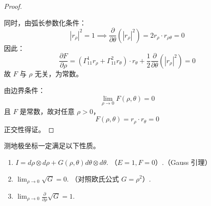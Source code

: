 \documentclass[lang=cn,10pt,thmcnt=section]{elegantbook}
\begin{document}
\begin{proof}
\begin{enumerate}
    同时，由弧长参数化条件：
    \[
    |r_\rho|^2 = 1 \implies \frac{\partial}{\partial \theta} (|r_\rho|^2) = 2 r_\rho \cdot r_{\rho\theta} = 0
    \]
    因此：
    \[
    \frac{\partial F}{\partial \rho} = (\Gamma_{11}^1 r_\rho + \Gamma_{11}^2 r_\theta) \cdot r_\theta + \frac{1}{2} \frac{\partial}{\partial \theta} (|r_\rho|^2) = 0
    \]
    故 \( F \) 与 \(\rho\) 无关，为常数。
\end{enumerate}

由边界条件：
\[
\lim_{\rho \to 0} F(\rho, \theta) = 0
\]
且 \( F \) 是常数，故对任意 \(\rho > 0\)，
\[
F(\rho, \theta) = r_\rho \cdot r_\theta = 0
\]
正交性得证。
\end{proof}

\begin{proposition}
    测地极坐标一定满足以下性质。

\begin{enumerate}
    \item $I = d\rho \otimes d\rho + G(\rho, \theta) d\theta \otimes d\theta.$ （$E = 1, F = 0$）.（Gauss 引理）
    \item $\lim_{\rho \to 0} \sqrt{G} = 0.$ （对照欧氏公式 $G = \rho^2$）.
    \item $\lim_{\rho \to 0} \frac{\partial}{\partial \rho} \sqrt{G} = 1.$
\end{enumerate}
\end{proposition}
\end{document}
